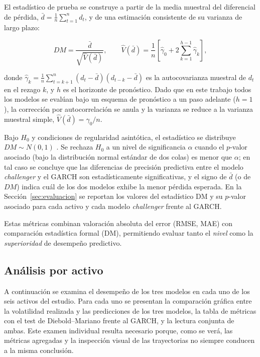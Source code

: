 \documentclass[12pt]{paper}
\begin{document}
El estadístico de prueba se construye a partir de la media muestral del diferencial de pérdida, $\bar{d} = \frac{1}{n}\sum_{t=1}^{n} d_t$, y de una estimación consistente de su varianza de largo plazo:

\begin{equation}
    DM = \frac{\bar{d}}{\sqrt{\widehat{V}(\bar{d})}}, \qquad
    \widehat{V}(\bar{d}) = \frac{1}{n}\left[\hat{\gamma}_0 + 2\sum_{k=1}^{h-1}\hat{\gamma}_k\right],
\end{equation}

donde $\hat{\gamma}_k = \frac{1}{n}\sum_{t=k+1}^{n}(d_t - \bar{d})(d_{t-k} - \bar{d})$ es la autocovarianza muestral de $d_t$ en el rezago $k$, y $h$ es el horizonte de pronóstico. Dado que en este trabajo todos los modelos se evalúan bajo un esquema de pronóstico a un paso adelante ($h = 1$), la corrección por autocorrelación se anula y la varianza se reduce a la varianza muestral simple, $\widehat{V}(\bar{d}) = \hat{\gamma}_0 / n$.

Bajo $H_0$ y condiciones de regularidad asintótica, el estadístico se distribuye $DM \sim N(0,1)$ \citep{diebold1995comparing}. Se rechaza $H_0$ a un nivel de significancia $\alpha$ cuando el $p$-valor asociado (bajo la distribución normal estándar de dos colas) es menor que $\alpha$; en tal caso se concluye que las diferencias de precisión predictiva entre el modelo \textit{challenger} y el GARCH son estadísticamente significativas, y el signo de $\bar{d}$ (o de $DM$) indica cuál de los dos modelos exhibe la menor pérdida esperada. En la Sección~\ref{sec:evaluacion} se reportan los valores del estadístico DM y su $p$-valor asociado para cada activo y cada modelo \textit{challenger} frente al GARCH.

Estas métricas combinan valoración absoluta del error (RMSE, MAE) con comparación estadística formal (DM), permitiendo evaluar tanto el \emph{nivel} como la \emph{superioridad} de desempeño predictivo.

\subsection{Análisis por activo}
\label{sec:analisis-por-activo}

A continuación se examina el desempeño de los tres modelos en cada uno de los seis activos del estudio. Para cada uno se presentan la comparación gráfica entre la volatilidad realizada y las predicciones de los tres modelos, la tabla de métricas con el test de Diebold--Mariano frente al GARCH, y la lectura conjunta de ambas. Este examen individual resulta necesario porque, como se verá, las métricas agregadas y la inspección visual de las trayectorias no siempre conducen a la misma conclusión.
\end{document}
